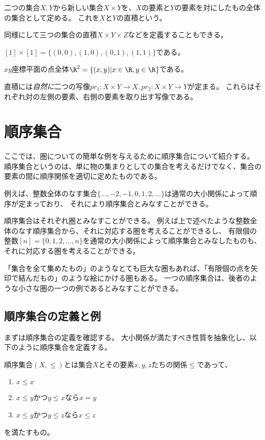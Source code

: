 \documentclass[uplatex]{jsarticle}
\begin{document}
\begin{dfn}[直積]
二つの集合$X, Y$から新しい集合$X \times Y$を、$X$の要素と$Y$の要素を対にしたもの全体の集合として定める。
これを$X$と$Y$の直積という。

同様にして三つの集合の直積$X \times Y \times Z$などを定義することもできる。
\end{dfn}

\begin{eg}
$[1] \times [1]=\{(0,0), (1,0), (0,1), (1,1)\}$である。
\end{eg}

\begin{eg}
$xy$座標平面の点全体$\R^2=\{(x,y)\vert x\in\R, y\in\R\}$である。
\end{eg}

直積には\emph{自然に}二つの写像$pr_1:X \times Y \to X, pr_2:X \times Y \to Y$が定まる。
これらはそれぞれ対の左側の要素、右側の要素を取り出す写像である。


\section{順序集合}
ここでは、圏についての簡単な例を与えるために順序集合について紹介する。
順序集合というのは、単に物の集まりとしての集合を考えるだけでなく、集合の要素の間に順序関係を適切に定めたものである。

例えば、整数全体のなす集合$\{\ldots,-2,-1,0, 1, 2, \ldots\}$は通常の大小関係によって順序が定まっており、
それにより順序集合とみなすことができる。

順序集合はそれぞれ圏とみなすことができる。
例えば上で述べたような整数全体のなす順序集合から、それに対応する圏を考えることができるし、
有限個の整数$[n]=\{0,1,2,\ldots,n\}$を通常の大小関係によって順序集合とみなしたものも、それに対応する圏を考えることができる。

「集合を全て集めたもの」のようなとても巨大な圏もあれば、「有限個の点を矢印で結んだもの」のような絵にかける圏もある。
一つの順序集合は、後者のような小さな圏の一つの例であるとみなすことができる。

\subsection{順序集合の定義と例}

まずは順序集合の定義を確認する。
大小関係が満たすべき性質を抽象化し、以下のように順序集合を定義する。
\begin{dfn}[順序集合]
順序集合$(X,\leq)$とは集合$X$とその要素$x, y, z$たちの関係$\leq$であって、
\begin{enumerate}
\item $x\leq x$
\item $x\leq y$かつ$y\leq x$なら$x=y$
\item $x\leq y$かつ$y\leq z$なら$x\leq z$
\end{enumerate}
を満たすもの。
\end{dfn}
\end{document}

